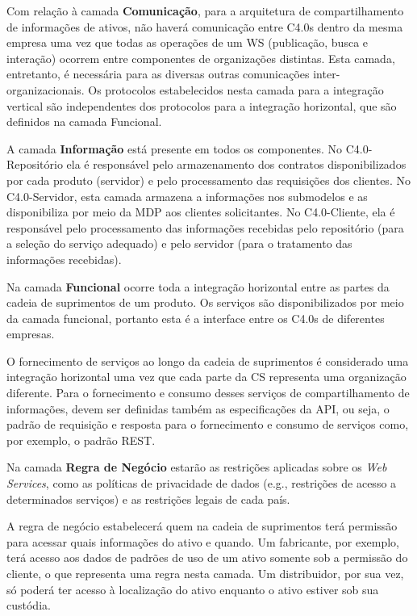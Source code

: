 Com relação à camada \textbf{Comunicação}, para a arquitetura de compartilhamento de informações de ativos, não haverá comunicação entre C4.0s dentro da mesma empresa uma vez que todas as operações de um WS (publicação, busca e interação) ocorrem entre componentes de organizações distintas. Esta camada, entretanto, é necessária para as diversas outras comunicações inter-organizacionais. Os protocolos estabelecidos nesta camada para a integração vertical são independentes dos protocolos para a integração horizontal, que são definidos na camada Funcional.

A camada \textbf{Informação} está presente em todos os componentes. No C4.0-Repositório ela é responsável pelo armazenamento dos contratos disponibilizados por cada produto (servidor) e pelo processamento das requisições dos clientes. No C4.0-Servidor, esta camada armazena a informações nos submodelos e as disponibiliza por meio da MDP aos clientes solicitantes. No C4.0-Cliente, ela é responsável pelo processamento das informações recebidas pelo repositório (para a seleção do serviço adequado) e pelo servidor (para o tratamento das informações recebidas).

Na camada \textbf{Funcional} ocorre toda a integração horizontal entre as partes da cadeia de suprimentos de um produto. Os serviços são disponibilizados por meio da camada funcional, portanto esta é a interface entre os C4.0s de diferentes empresas.

O fornecimento de serviços ao longo da cadeia de suprimentos é considerado uma integração horizontal uma vez que cada parte da CS representa uma organização diferente. Para o fornecimento e consumo desses serviços de compartilhamento de informações, devem ser definidas também as especificações da API, ou seja, o padrão de requisição e resposta para o fornecimento e consumo de serviços como, por exemplo, o padrão REST.

Na camada \textbf{Regra de Negócio} estarão as restrições aplicadas sobre os \textit{Web Services}, como as políticas de privacidade de dados (e.g., restrições de acesso a determinados serviços) e as restrições legais de cada país.

A regra de negócio estabelecerá quem na cadeia de suprimentos terá permissão para acessar quais informações do ativo e quando. Um fabricante, por exemplo, terá acesso aos dados de padrões de uso de um ativo somente sob a permissão do cliente, o que representa uma regra nesta camada. Um distribuidor, por sua vez, só poderá ter acesso à localização do ativo enquanto o ativo estiver sob sua custódia.

